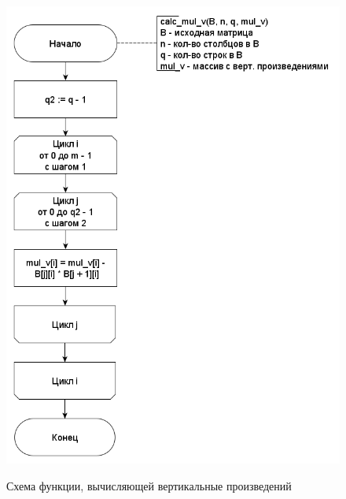 \documentclass[a4paper,14pt]{article}
\begin{document}
	    	    \begin{figure}[h!]
	    	\begin{center}
	    		{\includegraphics[scale = 0.5]{mul_v.png}}
	    		\caption{Схема функции, вычисляющей вертикальные произведений}
	    		\label{fig:schema_v}
	    	\end{center}
	    \end{figure}
	    
\end{document}
